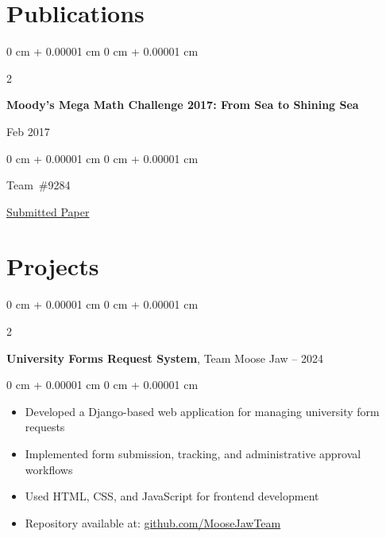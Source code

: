 \documentclass[10pt, letterpaper]{article}
\newenvironment{highlights}{
    \begin{itemize}[
        topsep=0.10 cm,
        parsep=0.10 cm,
        partopsep=0pt,
        itemsep=0pt,
        leftmargin=0 cm + 10pt
    ]
}{
    \end{itemize}
} %
\newenvironment{onecolentry}{
    \begin{adjustwidth}{
        0 cm + 0.00001 cm
    }{
        0 cm + 0.00001 cm
    }
}{
    \end{adjustwidth}
} %
\newenvironment{twocolentry}[2][]{
    \onecolentry
    \def\secondColumn{#2}
    \setcolumnwidth{\fill, 4.5 cm}
    \begin{paracol}{2}
}{
    \switchcolumn \raggedleft \secondColumn
    \end{paracol}
    \endonecolentry
} %
\let\hrefWithoutArrow\href
\begin{document}
    
    \section{Publications}



        
        \begin{samepage}
            \begin{twocolentry}{
                Feb 2017
            }
                \textbf{Moody's Mega Math Challenge 2017: From Sea to Shining Sea}
            \end{twocolentry}

            \vspace{0.10 cm}
            
            \begin{onecolentry}
                \mbox{Team \#9284}

                \vspace{0.10 cm}
                
        \href{https://docs.google.com/document/d/e/2PACX-1vS9IVVhRNeXyDAHOk5wKJdcYfUACNwhBMU7TTgpoyxhxotibb6dcwkIaIG6QH2rpQ/pub}{Submitted Paper}
        \end{onecolentry}
	
        \end{samepage}


    
    \section{Projects}


        
        \begin{twocolentry}{
            2023 – 2024
        }
            \textbf{University Forms Request System}, Team Moose Jaw\end{twocolentry}

        \vspace{0.10 cm}
        \begin{onecolentry}
            \begin{highlights}
                \item Developed a Django-based web application for managing university form requests
                \item Implemented form submission, tracking, and administrative approval workflows
                \item Used HTML, CSS, and JavaScript for frontend development
                \item Repository available at: \hrefWithoutArrow{https://github.com/MooseJawTeam/TeamMooseJaw}{github.com/MooseJawTeam}
            \end{highlights}
        \end{onecolentry}
\end{document}
